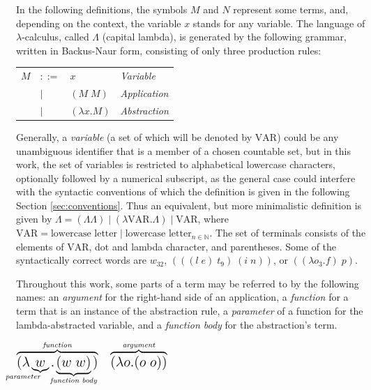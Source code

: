 \documentclass[table, a4paper, 10pt]{book}
\begin{document}
In the following definitions, the symbols $M$ and $N$ represent some terms, and,
depending on the context, the variable $x$ stands for any variable.
The language of $\lambda$-calculus, called $\Lambda$ (capital lambda), is generated by the following
grammar, written in Backus-Naur form, consisting of only three production rules:

\begin{center}
\begin{tabular}{llll}
$M$ &$::=$             &$x$              & {\small\hspace{0.4cm}\textit{Variable}}\\
    &\hspace{0.1cm}$|$ &$(M\;M)$         & {\small\hspace{0.4cm}\textit{Application}}\\
    &\hspace{0.1cm}$|$ &$(\lambda x.M)$  & {\small\hspace{0.4cm}\textit{Abstraction}}
\end{tabular}
\end{center}
Generally, a \textit{variable} (a set of which will be denoted by $\mathrm{VAR}$)
could be any unambiguous identifier 
that is a member of a chosen countable set, but in this work, the set
of variables is restricted to
alphabetical lowercase characters, optionally followed by a numerical subscript,
as the general case could interfere with the syntactic conventions
of which the definition is given in the following Section \ref{sec:conventions}.
Thus an equivalent, but more minimalistic definition is given by
$\Lambda = (\Lambda \Lambda)\;|\;(\lambda \mathrm{VAR}.\Lambda)\;|\;\mathrm{VAR}$, where
$\mathrm{VAR} = \text{lowercase letter}\;|\;\text{lowercase letter}_{n \in \mathbb{N}}$.
The set of terminals consists of the elements of $\mathrm{VAR}$, dot and lambda character, and parentheses.
Some of the syntactically correct words are $w_{32}$, $(((l\;e)\;t_9)\;(i\;n))$, or $((\lambda o_3.f)\;p)$.

Throughout this work, some parts of a term may be referred to by the following names:
an \textit{argument} for the right-hand side of an application, a \textit{function} for a term that is an instance of the 
abstraction rule, a \textit{parameter} of a function for the lambda-abstracted variable, and a \textit{function body}
for the abstraction's term.

\begin{center}
$\overbrace{\text{\Large$(\lambda$}\underbrace{\Large\text{$w$}}_{\mathllap{\textit{parameter}}}
\text{\Large$.$}\underbrace{\text{\Large$(w\;w)$}}_{\mathclap{\textit{function~body}}}\text{\Large$)$}}^{\textit{function}}
\text{\Large~~}
\overbrace{\text{\Large$(\lambda o.(o\;o))$}}^{\textit{argument}}
$
\end{center}
\end{document}
